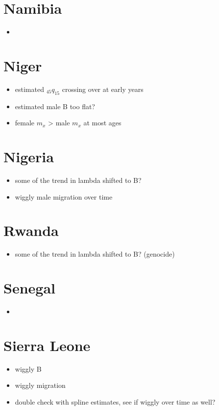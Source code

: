 \documentclass[12pt,a4paper]{article}
\begin{document}
\section*{Namibia}
\begin{itemize}
\item
\end{itemize}

\section*{Niger}
\begin{itemize}
\item estimated $_{45}q_{15}$ crossing over at early years
\item estimated male B too flat?
\item female $m_x$ > male $m_x$ at most ages
\end{itemize}

\section*{Nigeria}
\begin{itemize}
\item some of the trend in lambda shifted to B?
\item wiggly male migration over time
\end{itemize}

\section*{Rwanda}
\begin{itemize}
\item some of the trend in lambda shifted to B? (genocide)
\end{itemize}

\section*{Senegal}
\begin{itemize}
\item
\end{itemize}

\section*{Sierra Leone}
\begin{itemize}
\item wiggly B
\item wiggly migration
\item double check with spline estimates, see if wiggly over time as well?
\end{itemize}
\end{document}
